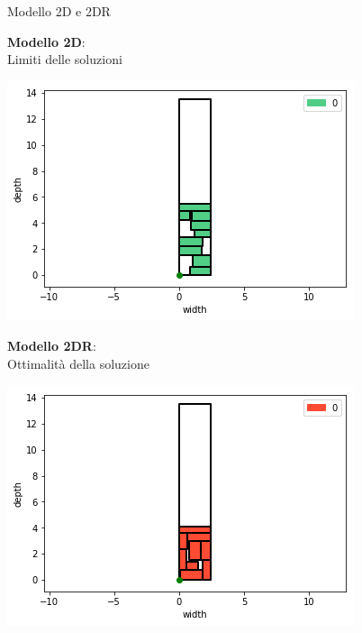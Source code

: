 \documentclass{beamer}
\begin{document}
\begin{frame}{Modello 2D e 2DR}
						
	\begin{minipage}[c]{0.45\textwidth}
		\textbf{Modello 2D}:\\Limiti delle soluzioni
	\end{minipage}
	\hfill
	\begin{minipage}[c]{0.45\textwidth}
		\includegraphics[width=1\linewidth]{figures/general2D}
	\end{minipage}
				
	\begin{minipage}[c]{0.45\textwidth}
		\textbf{Modello 2DR}:\\Ottimalit\`a della soluzione
	\end{minipage}
	\hfill
	\begin{minipage}[c]{0.45\textwidth}
		\includegraphics[width=1\linewidth]{figures/general2DR}
	\end{minipage}
\end{frame}
\end{document}
